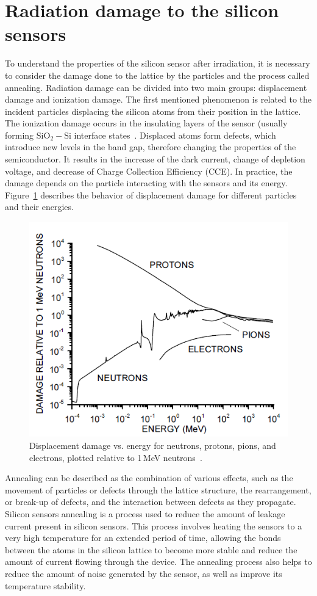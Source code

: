 \section{Radiation damage to the silicon sensors}
\label{silicon_damage}
To understand the properties of the silicon sensor after irradiation, it is necessary to consider the damage done to the lattice by the particles and the process called annealing. Radiation damage can be divided into two main groups: displacement damage and ionization damage. The first mentioned phenomenon is related to the incident particles displacing the silicon atoms from their position in the lattice. The ionization damage occurs in the insulating layers of the sensor (usually forming $\mathrm{SiO_{2}-Si}$ interface states~\cite{Moll:1999kv}. Displaced atoms form defects, which introduce new levels in the band gap, therefore changing the properties of the semiconductor. It results in the increase of the dark current, change of depletion voltage, and decrease of Charge Collection Efficiency (\gls{CCE}). In practice, the damage depends on the particle interacting with the sensors and its energy. Figure~\ref{fig_niel_si} describes the behavior of displacement damage for different particles and their energies.  
\begin{figure}[!h]
\centering
\includegraphics[width=0.7\columnwidth]{Chapter2/images/displacement_damage.png}
\caption{Displacement damage vs. energy for neutrons, protons, pions, and electrons,
plotted relative to 1\,MeV neutrons~\cite{Spieler}.}
\label{fig_niel_si}
\end{figure}

Annealing can be described as the combination of various effects, such as the movement of particles or defects through the lattice structure, the rearrangement, or break-up of defects, and the interaction between defects as they propagate. Silicon sensors annealing is a process used to reduce the amount of leakage current present in silicon sensors. This process involves heating the sensors to a very high temperature for an extended period of time, allowing the bonds between the atoms in the silicon lattice to become more stable and reduce the amount of current flowing through the device. The annealing process also helps to reduce the amount of noise generated by the sensor, as well as improve its temperature stability. \bigbreak

